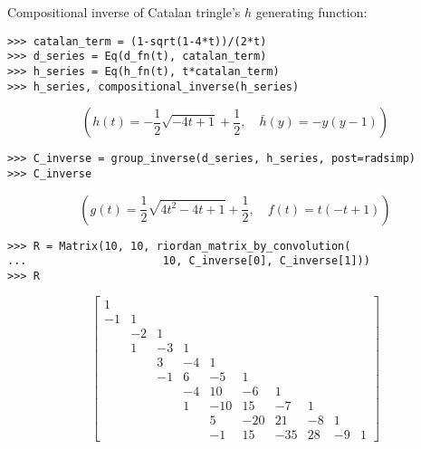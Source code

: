 \begin{example}
Compositional inverse of Catalan tringle's $h$ generating function:
\begin{verbatim}
>>> catalan_term = (1-sqrt(1-4*t))/(2*t)
>>> d_series = Eq(d_fn(t), catalan_term)
>>> h_series = Eq(h_fn(t), t*catalan_term)
>>> h_series, compositional_inverse(h_series)
\end{verbatim}
\begin{displaymath}
\left ( h{\left (t \right )} = - \frac{1}{2} \sqrt{- 4 t + 1} + \frac{1}{2}, \quad \bar{ h }{\left (y \right )} = - y \left(y - 1\right)\right )
\end{displaymath}
\begin{verbatim}
>>> C_inverse = group_inverse(d_series, h_series, post=radsimp)
>>> C_inverse
\end{verbatim}
\begin{displaymath}
\left ( g{\left (t \right )} = \frac{1}{2} \sqrt{4 t^{2} - 4 t + 1} + \frac{1}{2}, \quad f{\left (t \right )} = t \left(- t + 1\right)\right )
\end{displaymath}
\begin{verbatim}
>>> R = Matrix(10, 10, riordan_matrix_by_convolution(
...                     10, C_inverse[0], C_inverse[1]))
>>> R
\end{verbatim}
\begin{displaymath}
\left[\begin{matrix}1 &   &   &   &   &   &   &   &   &  \\-1 & 1 &   &   &   &   &   &   &   &  \\  & -2 & 1 &   &   &   &   &   &   &  \\  & 1 & -3 & 1 &   &   &   &   &   &  \\  &   & 3 & -4 & 1 &   &   &   &   &  \\  &   & -1 & 6 & -5 & 1 &   &   &   &  \\  &   &   & -4 & 10 & -6 & 1 &   &   &  \\  &   &   & 1 & -10 & 15 & -7 & 1 &   &  \\  &   &   &   & 5 & -20 & 21 & -8 & 1 &  \\  &   &   &   & -1 & 15 & -35 & 28 & -9 & 1\end{matrix}\right]
\end{displaymath}
\end{example}
